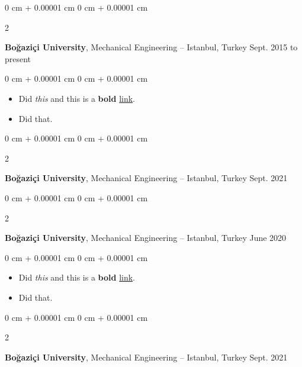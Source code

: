 \documentclass[10pt, letterpaper]{article}
\newenvironment{highlights}{
    \begin{itemize}[
        topsep=0.10 cm,
        parsep=0.10 cm,
        partopsep=0pt,
        itemsep=0pt,
        leftmargin=0 cm + 10pt
    ]
}{
    \end{itemize}
} %
\newenvironment{onecolentry}{
    \begin{adjustwidth}{
        0 cm + 0.00001 cm
    }{
        0 cm + 0.00001 cm
    }
}{
    \end{adjustwidth}
} %
\newenvironment{twocolentry}[2][]{
    \onecolentry
    \def\secondColumn{#2}
    \setcolumnwidth{\fill, 4.5 cm}
    \begin{paracol}{2}
}{
    \switchcolumn \raggedleft \secondColumn
    \end{paracol}
    \endonecolentry
} %
\begin{document}
        \vspace{0.2 cm}

        \begin{twocolentry}{
            Sept. 2015 to present
        }
            \textbf{Boğaziçi University}, Mechanical Engineering -- Istanbul, Turkey\end{twocolentry}

        \vspace{0.10 cm}
        \begin{onecolentry}
            \begin{highlights}
                \item Did \textit{this} and this is a \textbf{bold} \href{https://example.com}{link}.
                \item Did that.
            \end{highlights}
        \end{onecolentry}


        \vspace{0.2 cm}

        \begin{twocolentry}{
            Sept. 2021
        }
            \textbf{Boğaziçi University}, Mechanical Engineering -- Istanbul, Turkey\end{twocolentry}



        \vspace{0.2 cm}

        \begin{twocolentry}{
            June 2020
        }
            \textbf{Boğaziçi University}, Mechanical Engineering -- Istanbul, Turkey\end{twocolentry}

        \vspace{0.10 cm}
        \begin{onecolentry}
            \begin{highlights}
                \item Did \textit{this} and this is a \textbf{bold} \href{https://example.com}{link}.
                \item Did that.
            \end{highlights}
        \end{onecolentry}


        \vspace{0.2 cm}

        \begin{twocolentry}{
            Sept. 2021
        }
            \textbf{Boğaziçi University}, Mechanical Engineering -- Istanbul, Turkey\end{twocolentry}
\end{document}
